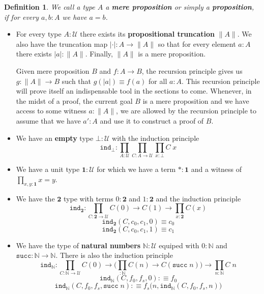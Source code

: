 \documentclass[12pt]{report}
\newtheorem{defn}[thm]{Definition}
\theoremstyle{definition}
\begin{document}
	\begin{defn}
	We call a type $A$ a \textbf{mere proposition} or simply a \textbf{proposition}, if for every $a,b : A$ we have $a = b$.
	\end{defn}
\begin{itemize}
	\item For every type $A : \mathcal{U}$ there exists its \textbf{propositional truncation} $\| A \|$. 
	We also have the truncation map $|\cdot| : A \rightarrow \lVert A \rVert$ so that for every element $a : A$ there exists $|a| : \| A\|$. 
	Finally, $\lVert A\rVert$ is a mere proposition.  

	Given mere proposition $B$ and $f : A \rightarrow B$, the recursion principle gives us $g : \|A\| \rightarrow B$ such that $g(|a|) \equiv f(a)$ for all $a : A$.
	This recursion principle will prove itself an indispensable tool in the sections to come. 
	Whenever, in the midst of a proof, the current goal $B$ is a mere proposition and we have access to some witness $a : \lVert A \rVert$, we are allowed by the recursion principle to assume that we have $a' : A$ and use it to construct a proof of $B$.
	\item We have an \textbf{empty} type $\bot : \mathcal{U}$ with the induction principle
	$$\mathtt{ind}_\bot : \prod_{A : \mathcal{U}}\prod_{C : A \rightarrow \mathcal{U}} \prod_{x  :\bot} C\;x$$
	\item We have a unit type $\mathbf{1} : \mathcal{U}$ for which we have a term $* : \mathbf{1}$ and a witness of $\prod_{x,y : \mathbf{1}} x =y$. 
	\item We have the $\mathbf{2}$ type with terms $0 : \mathbf{2}$ and $1 : \mathbf{2}$ and the induction principle
	$$\mathtt{ind}_\mathbf{2} : \prod_{C : \mathbf{2} \rightarrow \mathcal{U}}C(0)\rightarrow C(1) \rightarrow \prod_{x : \mathbf{2}}C(x)$$
	$$\mathtt{ind}_\mathbf{2}(C, c_0, c_1, 0) \equiv c_0$$
	$$\mathtt{ind}_\mathbf{2}(C, c_0, c_1, 1) \equiv c_1$$
	\item We have the type of \textbf{natural numbers} $\mathbb{N} : \mathcal{U}$ equiped with $0 : \mathbb{N}$ and $\mathtt{succ} : \mathbb{N} \rightarrow \mathbb{N}$. 
	There is also the induction principle
	$$\mathtt{ind}_\mathbb{N} : \prod_{C : \mathbb{N} \rightarrow \mathcal{U}}C(0)\rightarrow \big(\prod_{ : \mathbb{N}} C(n) \rightarrow C(\mathtt{succ}\;n)\big)\rightarrow \prod_{n : \mathbb{N}}C\;n$$
	$$\mathtt{ind}_\mathbb{N}(C, f_0, f_s, 0) :\equiv f_0$$
	$$\mathtt{ind}_\mathbb{N}(C, f_0, f_s, \mathtt{succ}\;n) :\equiv f_s\big(n, \mathtt{ind}_\mathbb{N}(C,f_0, f_s, n)\big)$$


\end{itemize}
\end{document}
